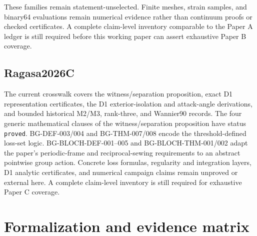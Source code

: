 \documentclass[11pt]{article}
\begin{document}
These families remain statement-unselected. Finite meshes, strain samples, and
binary64 evaluations remain numerical evidence rather than continuum proofs or checked
certificates. A complete claim-level inventory comparable to the Paper A ledger is still
required before this working paper can assert exhaustive Paper B coverage.

\subsection{Ragasa2026C}

The current crosswalk covers the witness/separation proposition, exact D1 representation
certificates, the D1 exterior-isolation and attack-angle derivations, and bounded
historical M2/M3, rank-three, and Wannier90 records. The four generic mathematical
clauses of the witness/separation proposition have status \texttt{proved}. BG-DEF-003/004
and BG-THM-007/008 encode the threshold-defined loss-set logic. BG-BLOCH-DEF-001--005
and BG-BLOCH-THM-001/002 adapt the paper's periodic-frame and reciprocal-sewing
requirements to an abstract pointwise group action. Concrete loss formulas, regularity
and integration layers, D1 analytic certificates, and numerical campaign claims remain
unproved or external here. A complete claim-level inventory is
still required for exhaustive Paper C coverage.

\section{Formalization and evidence matrix}
\end{document}
